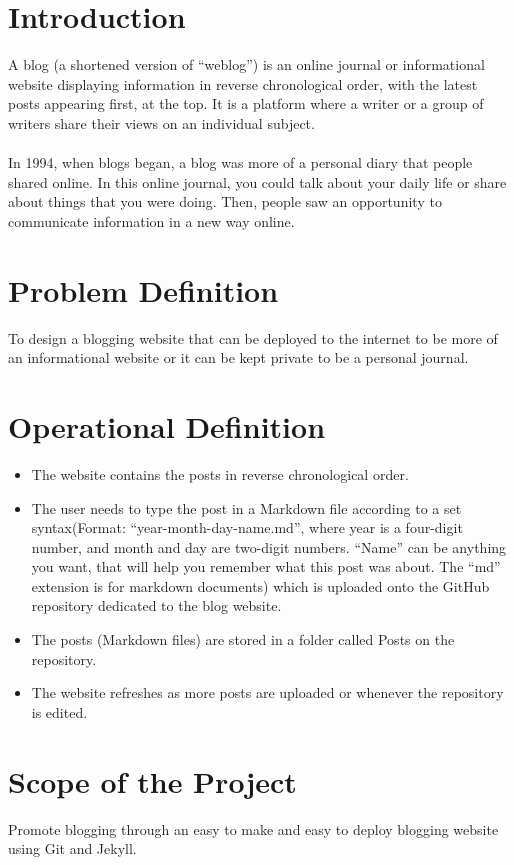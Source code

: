 \documentclass[a4paper,14pt]{extarticle}
\begin{document}
\pagebreak

\section{Introduction}
A blog (a shortened version of “weblog”) is an online journal or informational website displaying information in reverse chronological order, with the latest posts appearing first, at the top. It is a platform where a writer or a group of writers share their views on an individual subject.\\\\
In 1994, when blogs began, a blog was more of a personal diary that people shared online. In this online journal, you could talk about your daily life or share about things that you were doing. Then, people saw an opportunity to communicate information in a new way online.

\section{Problem Definition}
To design a blogging website that can be deployed to the internet to be more of an informational website or it can be kept private to be a personal journal.

\section{Operational Definition}
\begin{itemize}
    \item The website contains the posts in reverse chronological order.
    \item The user needs to type the post in a Markdown file according to a set syntax(Format: “year-month-day-name.md”, where year is a four-digit number, and month and day are two-digit numbers. “Name” can be anything you want, that will help you remember what this post was about. The “md” extension is for markdown documents) which is uploaded onto the GitHub repository dedicated to the blog website.
    \item The posts (Markdown files) are stored in a folder called Posts on the repository.
    \item The website refreshes as more posts are uploaded or whenever the repository is edited.
\end{itemize}

\pagebreak

\section{Scope of the Project}
Promote blogging through an easy to make and easy to deploy blogging website using Git and Jekyll.
\end{document}
